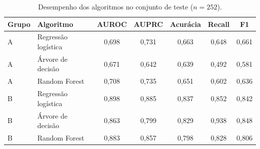 \begin{table}[htbp]
\centering
\caption{Desempenho dos algoritmos no conjunto de teste ($n=252$).}
\label{tab:metricas}
\footnotesize
\setlength{\tabcolsep}{4pt}
\begin{tabular}{@{}llccccc@{}}
\toprule
\textbf{Grupo} & \textbf{Algoritmo} & \textbf{AUROC} & \textbf{AUPRC} & \textbf{Acurácia} & \textbf{Recall} & \textbf{F1}\\
\midrule
A & Regressão logística & 0,698 & 0,731 & 0,663 & 0,648 & 0,661\\
A & Árvore de decisão & 0,671 & 0,642 & 0,639 & 0,492 & 0,581\\
A & Random Forest & 0,708 & 0,735 & 0,651 & 0,602 & 0,636\\
\midrule
B & Regressão logística & 0,898 & 0,885 & 0,837 & 0,852 & 0,842\\
B & Árvore de decisão & 0,863 & 0,799 & 0,829 & 0,938 & 0,848\\
B & Random Forest & 0,883 & 0,857 & 0,798 & 0,828 & 0,806\\
\bottomrule
\end{tabular}
\par{}
\end{table}
